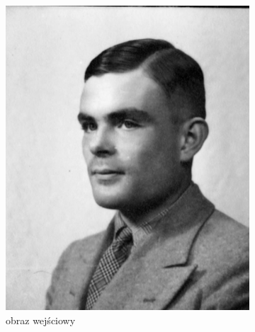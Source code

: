 \documentclass[a4paper, 12pt, polish, twoside]{extreport}
\begin{document}
\begin{figure}[H]
\begin{subfigure}{0.24\textwidth}
        \includegraphics[width = \textwidth]{img/6-comp/turing_original_c10_inv0.png}
        \caption{obraz wejściowy}
        \label{comp-comp-dali-turing-fawkes-e}
    \end{subfigure}
    \begin{subfigure}{0.24\textwidth}
        \centering

\end{subfigure}
\end{figure}
\end{document}
